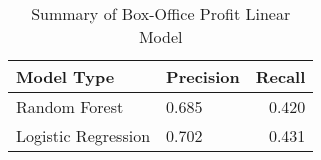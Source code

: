 \begin{table}[ht]
\centering
\begin{tabular}{llr}
  \hline
Model Type & Precision & Recall \\ 
  \hline
Random Forest & 0.685 & 0.420 \\
Logistic Regression & 0.702 & 0.431 \\
   \hline
\end{tabular}
\caption{Summary of Box-Office Profit Linear Model} 
\label{tab:lm_sum}
\end{table}

